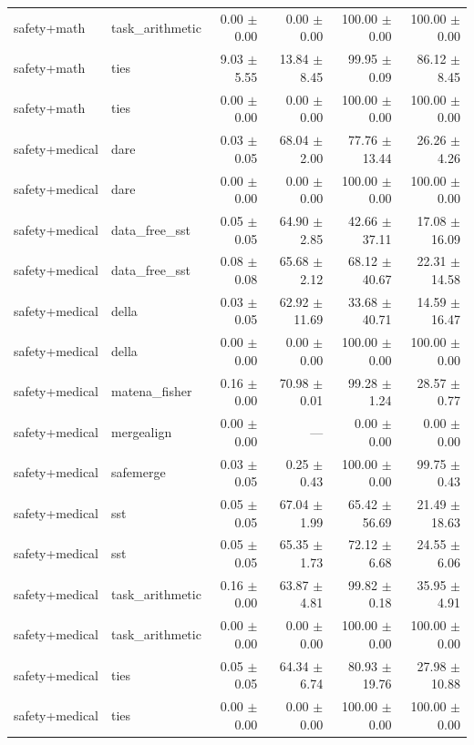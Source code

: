 \begin{table}[H]
{\begin{tabular}{llrrrr}
safety+math & task\_arithmetic & 0.00 $\pm$ 0.00 & 0.00 $\pm$ 0.00 & 100.00 $\pm$ 0.00 & 100.00 $\pm$ 0.00 \\
safety+math & ties & 9.03 $\pm$ 5.55 & 13.84 $\pm$ 8.45 & 99.95 $\pm$ 0.09 & 86.12 $\pm$ 8.45 \\
safety+math & ties & 0.00 $\pm$ 0.00 & 0.00 $\pm$ 0.00 & 100.00 $\pm$ 0.00 & 100.00 $\pm$ 0.00 \\
safety+medical & dare & 0.03 $\pm$ 0.05 & 68.04 $\pm$ 2.00 & 77.76 $\pm$ 13.44 & 26.26 $\pm$ 4.26 \\
safety+medical & dare & 0.00 $\pm$ 0.00 & 0.00 $\pm$ 0.00 & 100.00 $\pm$ 0.00 & 100.00 $\pm$ 0.00 \\
safety+medical & data\_free\_sst & 0.05 $\pm$ 0.05 & 64.90 $\pm$ 2.85 & 42.66 $\pm$ 37.11 & 17.08 $\pm$ 16.09 \\
safety+medical & data\_free\_sst & 0.08 $\pm$ 0.08 & 65.68 $\pm$ 2.12 & 68.12 $\pm$ 40.67 & 22.31 $\pm$ 14.58 \\
safety+medical & della & 0.03 $\pm$ 0.05 & 62.92 $\pm$ 11.69 & 33.68 $\pm$ 40.71 & 14.59 $\pm$ 16.47 \\
safety+medical & della & 0.00 $\pm$ 0.00 & 0.00 $\pm$ 0.00 & 100.00 $\pm$ 0.00 & 100.00 $\pm$ 0.00 \\
safety+medical & matena\_fisher & 0.16 $\pm$ 0.00 & 70.98 $\pm$ 0.01 & 99.28 $\pm$ 1.24 & 28.57 $\pm$ 0.77 \\
safety+medical & mergealign & 0.00 $\pm$ 0.00 & --- & 0.00 $\pm$ 0.00 & 0.00 $\pm$ 0.00 \\
safety+medical & safemerge & 0.03 $\pm$ 0.05 & 0.25 $\pm$ 0.43 & 100.00 $\pm$ 0.00 & 99.75 $\pm$ 0.43 \\
safety+medical & sst & 0.05 $\pm$ 0.05 & 67.04 $\pm$ 1.99 & 65.42 $\pm$ 56.69 & 21.49 $\pm$ 18.63 \\
safety+medical & sst & 0.05 $\pm$ 0.05 & 65.35 $\pm$ 1.73 & 72.12 $\pm$ 6.68 & 24.55 $\pm$ 6.06 \\
safety+medical & task\_arithmetic & 0.16 $\pm$ 0.00 & 63.87 $\pm$ 4.81 & 99.82 $\pm$ 0.18 & 35.95 $\pm$ 4.91 \\
safety+medical & task\_arithmetic & 0.00 $\pm$ 0.00 & 0.00 $\pm$ 0.00 & 100.00 $\pm$ 0.00 & 100.00 $\pm$ 0.00 \\
safety+medical & ties & 0.05 $\pm$ 0.05 & 64.34 $\pm$ 6.74 & 80.93 $\pm$ 19.76 & 27.98 $\pm$ 10.88 \\
safety+medical & ties & 0.00 $\pm$ 0.00 & 0.00 $\pm$ 0.00 & 100.00 $\pm$ 0.00 & 100.00 $\pm$ 0.00 \\
\bottomrule
\end{tabular}
}
\end{table}